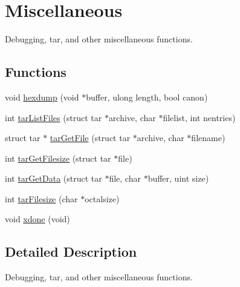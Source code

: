 \hypertarget{group__misc}{\section{Miscellaneous}
\label{group__misc}
}


Debugging, tar, and other miscellaneous functions.  


\subsection*{Functions}
\begin{DoxyCompactItemize}
\item 
void \hyperlink{group__misc_ga5bc0d7c8691391445b85777874908adb}{hexdump} (void $\ast$buffer, ulong length, bool canon)
\item 
int \hyperlink{group__misc_ga5bfc2d506c06303b7d2d5ab0d8e1e4a3}{tar\-List\-Files} (struct tar $\ast$archive, char $\ast$filelist, int nentries)
\item 
struct tar $\ast$ \hyperlink{group__misc_gaac8d47f2f9843915c59f1bbd99995ba9}{tar\-Get\-File} (struct tar $\ast$archive, char $\ast$filename)
\item 
int \hyperlink{group__misc_ga39107e527d7aa1192e146494b3f5418f}{tar\-Get\-Filesize} (struct tar $\ast$file)
\item 
int \hyperlink{group__misc_ga31ab4c8036ca4560c0843ed4f1f822ff}{tar\-Get\-Data} (struct tar $\ast$file, char $\ast$buffer, uint size)
\item 
int \hyperlink{group__misc_ga0e59f38babb1deeb090451be341189f3}{tar\-Filesize} (char $\ast$octalsize)
\item 
void \hyperlink{group__misc_ga1660c9984ab15425f280b8649d318a53}{xdone} (void)
\end{DoxyCompactItemize}


\subsection{Detailed Description}
Debugging, tar, and other miscellaneous functions. 


